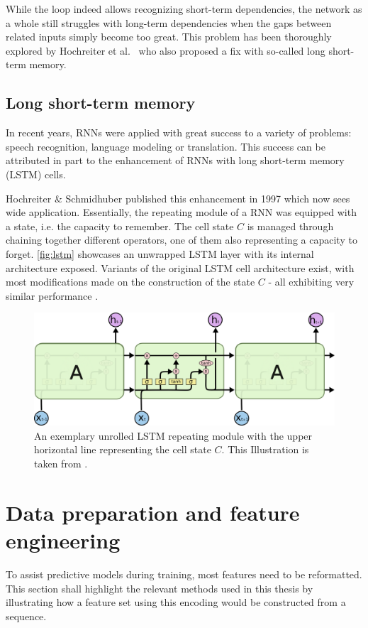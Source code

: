 While the loop indeed allows recognizing short-term dependencies, the network as a whole still struggles with long-term dependencies when the gaps between related inputs simply become too great. This problem has been thoroughly explored by Hochreiter et al.~\cite{hochreiter1991untersuchungen} who also proposed a fix with so-called long short-term memory.

\subsection{Long short-term memory}
In recent years, RNNs were applied with great success to a variety of problems: speech recognition, language modeling or translation. This success can be attributed in part to the enhancement of RNNs with long short-term memory (LSTM) cells.

Hochreiter \& Schmidhuber published this enhancement in 1997 \cite{hochreiter1997} which now sees wide application. Essentially, the repeating module of a RNN was equipped with a state, i.e. the capacity to remember. The cell state $C$ is managed through chaining together different operators, one of them also representing a capacity to forget. \autoref{fig:lstm} showcases an unwrapped LSTM layer with its internal architecture exposed. Variants of the original LSTM cell architecture exist, with most modifications made on the construction of the state $C$ - all exhibiting very similar performance \cite{greff2017lstm}.

\begin{figure}[ht!]
    \centering
    \includegraphics[width=.8\textwidth]{gfx/lstm-chain.png}
    \caption{An exemplary unrolled LSTM repeating module with the upper horizontal line representing the cell state $C$. This Illustration is taken from \cite{web:colah}.}
    \label{fig:lstm}
\end{figure}

\section{Data preparation and feature engineering}
To assist predictive models during training, most features need to be reformatted. This section shall highlight the relevant methods used in this thesis by illustrating how a feature set using this encoding would be constructed from a sequence.

